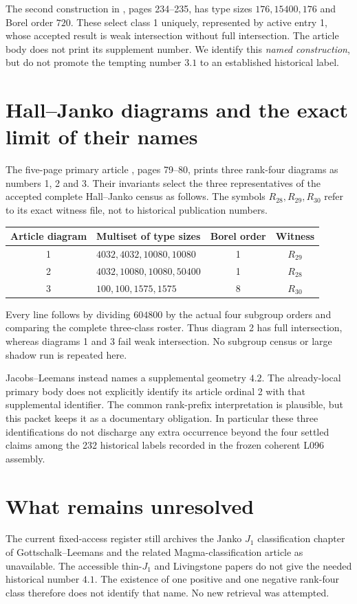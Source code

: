 \documentclass[11pt,a4paper]{article}
\begin{document}
The second construction in \cite{HS}, pages 234--235, has type sizes
$176,15400,176$ and Borel order $720$. These select class 1 uniquely,
represented by active entry 1, whose accepted result is weak
intersection without full intersection. The article body does not print
its supplement number. We identify this \emph{named construction}, but
do not promote the tempting number $3.1$ to an established historical
label.

\section{Hall--Janko diagrams and the exact limit of their names}
The five-page primary article \cite{J2}, pages 79--80, prints three
rank-four diagrams as numbers 1, 2 and 3. Their invariants select the
three representatives of the accepted complete Hall--Janko census as
follows. The symbols $R_{28},R_{29},R_{30}$ refer to its exact witness
file, not to historical publication numbers.
\begin{center}\begin{tabular}{clcc}
\toprule
Article diagram & Multiset of type sizes & Borel order & Witness\\
\midrule
1 & $4032,4032,10080,10080$ & 1 & $R_{29}$\\
2 & $4032,10080,10080,50400$ & 1 & $R_{28}$\\
3 & $100,100,1575,1575$ & 8 & $R_{30}$\\
\bottomrule
\end{tabular}\end{center}
Every line follows by dividing $604800$ by the actual four subgroup
orders and comparing the complete three-class roster. Thus diagram 2
has full intersection, whereas diagrams 1 and 3 fail weak intersection.
No subgroup census or large shadow run is repeated here.

Jacobs--Leemans instead names a supplemental geometry $4.2$.
The already-local primary body does not explicitly identify its article
ordinal 2 with that supplemental identifier. The common rank-prefix
interpretation is plausible, but this packet keeps it as a documentary
obligation. In particular these three identifications do not discharge
any extra occurrence beyond the four settled claims among the 232 historical labels recorded in the
frozen coherent L096 assembly.

\section{What remains unresolved}
The current fixed-access register still archives the Janko $J_1$
classification chapter of Gottschalk--Leemans and the related
Magma-classification article as unavailable. The accessible thin-$J_1$
and Livingstone papers do not give the needed historical number $4.1$.
The existence of one positive and one negative rank-four class therefore
does not identify that name. No new retrieval was attempted.
\end{document}
